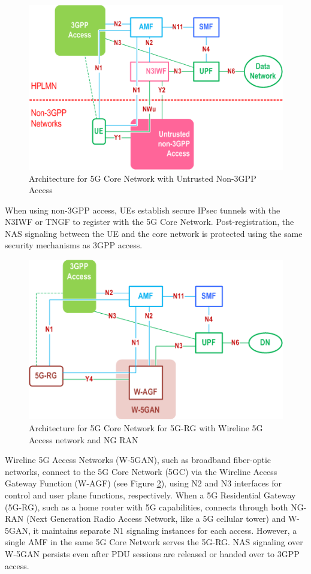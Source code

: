 \begin{figure}
    \centering
    \includegraphics[width=0.5\linewidth]{figs/architecture-for-5g-core-network-with-untrusted-non-3gpp-access.png}
    \caption{Architecture for 5G Core Network with Untrusted Non-3GPP Access}
    \label{fig:architecture-for-5g-core-network-with-untrusted-non-3gpp-access}
\end{figure}

When using non-\ac{3GPP} access, UEs establish secure IPsec tunnels with the N3IWF or TNGF to register with the 5G Core Network. Post-registration, the NAS signaling between the UE and the core network is protected using the same security mechanisms as 3GPP access.

\begin{figure}
    \centering
    \includegraphics[width=0.5\linewidth]{figs/Architecture for 5G Core Network for 5G-RG with Wireline 5G Access network and NG RAN.png}
    \caption{Architecture for 5G Core Network for 5G-RG with Wireline 5G Access network and NG RAN}
    \label{fig:Architecture for 5G Core Network for 5G-RG with Wireline 5G Access network and NG RAN}
\end{figure}

Wireline 5G Access Networks (W-5GAN), such as broadband fiber-optic networks, connect to the 5G Core Network (5GC) via the Wireline Access Gateway Function (W-AGF) (see Figure \ref{fig:Architecture for 5G Core Network for 5G-RG with Wireline 5G Access network and NG RAN}), using N2 and N3 interfaces for control and user plane functions, respectively. When a 5G Residential Gateway (5G-RG), such as a home router with 5G capabilities, connects through both NG-RAN (Next Generation Radio Access Network, like a 5G cellular tower) and W-5GAN, it maintains separate N1 signaling instances for each access. However, a single AMF in the same 5G Core Network serves the 5G-RG. NAS signaling over W-5GAN persists even after PDU sessions are released or handed over to 3GPP access.

